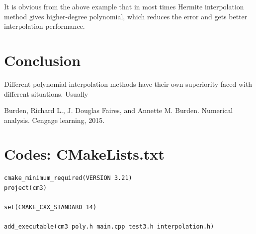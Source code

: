 \documentclass[12pt]{article}
\begin{document}
It is obvious from the above example that in most times Hermite interpolation method gives higher-degree polynomial, which reduces the error and gets better interpolation performance.

\section{Conclusion}

Different polynomial interpolation methods have their own superiority faced with different situations. Usually 

\begin{thebibliography}{99}
 Burden, Richard L., J. Douglas Faires, and Annette M. Burden. Numerical analysis. Cengage learning, 2015.

\end{thebibliography}

\appendix

\section{Codes: CMakeLists.txt}

\begin{lstlisting}
cmake_minimum_required(VERSION 3.21)
project(cm3)

set(CMAKE_CXX_STANDARD 14)

add_executable(cm3 poly.h main.cpp test3.h interpolation.h)
\end{lstlisting}
\end{document}
